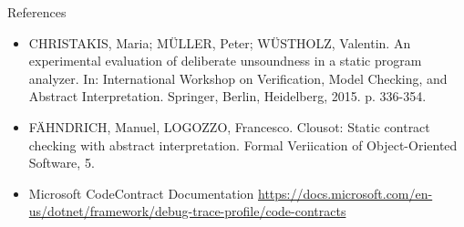 \begin{frame}{References}

\vspace*{-0.8cm}

\small

\begin{itemize}
  \item CHRISTAKIS, Maria; MÜLLER, Peter; WÜSTHOLZ, Valentin. An experimental
  evaluation of deliberate unsoundness in a static program analyzer. In:
  International Workshop on Verification, Model Checking, and Abstract
  Interpretation. Springer, Berlin, Heidelberg, 2015. p. 336-354.

  \vspace*{0.4cm}

  \item F{\"A}HNDRICH, Manuel, LOGOZZO, Francesco. Clousot: Static contract
  checking with abstract interpretation. Formal Veriication of Object-Oriented
  Software, 5.

  \vspace*{0.4cm}

  \item Microsoft CodeContract Documentation
  \url{https://docs.microsoft.com/en-us/dotnet/framework/debug-trace-profile/code-contracts}
\end{itemize}

\end{frame}